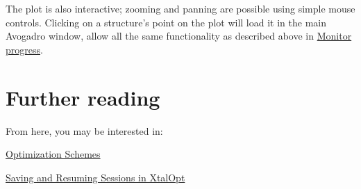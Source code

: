 The plot is also interactive; zooming and panning are possible using simple mouse controls. Clicking on a structure's point on the plot will load it in the main Avogadro window, allow all the same functionality as described above in \hyperlink{tut-xo_prog-mon}{Monitor progress}.\hypertarget{tut-xo_xo_tut_further}{}\section{Further reading}\label{tut-xo_xo_tut_further}
From here, you may be interested in\-:
\begin{DoxyItemize}
\item \hyperlink{optschemes}{Optimization Schemes}
\item \hyperlink{xo_saveresume}{Saving and Resuming Sessions in Xtal\-Opt} 
\end{DoxyItemize}